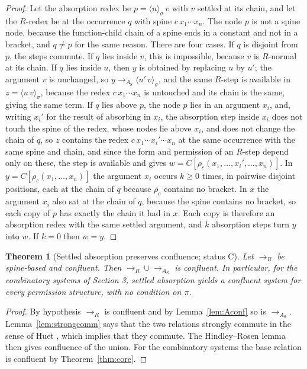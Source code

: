 \documentclass[11pt]{article}
\newtheorem{theorem}{Theorem}[section]
\theoremstyle{definition}
\theoremstyle{remark}
\newcommand{\br}[2]{\langle #1\rangle_{#2}}
\newcommand{\Ct}{status C}
\begin{document}
\begin{proof}
Let the absorption redex be $p=\br u\sigma\,v$ with $v$ settled at its chain, and let the $R$-redex be at the occurrence $q$ with spine $c\,x_1\cdots x_n$. The node $p$ is not a spine node, because the function-child chain of a spine ends in a constant and not in a bracket, and $q\ne p$ for the same reason. There are four cases. If $q$ is disjoint from $p$, the steps commute. If $q$ lies inside $v$, this is impossible, because $v$ is $R$-normal at its chain. If $q$ lies inside $u$, then $y$ is obtained by replacing $u$ by $u'$; the argument $v$ is unchanged, so $y\to_{A_{\mathrm S}}\br{u'\,v}\sigma$, and the same $R$-step is available in $z=\br{u\,v}\sigma$, because the redex $c\,x_1\cdots x_n$ is untouched and its chain is the same, giving the same term. If $q$ lies above $p$, the node $p$ lies in an argument $x_i$, and, writing $x_i'$ for the result of absorbing in $x_i$, the absorption step inside $x_i$ does not touch the spine of the redex, whose nodes lie above $x_i$, and does not change the chain of $q$, so $z$ contains the redex $c\,x_1\cdots x_i'\cdots x_n$ at the same occurrence with the same spine and chain, and since the form and permission of an $R$-step depend only on these, the step is available and gives $w=C[\rho_c(x_1,\dots,x_i',\dots,x_n)]$. In $y=C[\rho_c(x_1,\dots,x_n)]$ the argument $x_i$ occurs $k\ge0$ times, in pairwise disjoint positions, each at the chain of $q$ because $\rho_c$ contains no bracket. In $x$ the argument $x_i$ also sat at the chain of $q$, because the spine contains no bracket, so each copy of $p$ has exactly the chain it had in $x$. Each copy is therefore an absorption redex with the same settled argument, and $k$ absorption steps turn $y$ into $w$. If $k=0$ then $w=y$.
\end{proof}

\begin{theorem}[Settled absorption preserves confluence; \Ct]\label{thm:settled}
Let $\to_R$ be spine-based and confluent. Then $\to_R\cup\to_{A_{\mathrm S}}$ is confluent. In particular, for the combinatory systems of Section 3, settled absorption yields a confluent system for every permission structure, with no condition on $\pi$.
\end{theorem}

\begin{proof}
By hypothesis $\to_R$ is confluent and by Lemma~\ref{lem:Aconf} so is $\to_{A_{\mathrm S}}$. Lemma~\ref{lem:strongcomm} says that the two relations strongly commute in the sense of Huet \citep{huet1980}, which implies that they commute. The Hindley--Rosen lemma \citep[Ch.~1]{terese2003} then gives confluence of the union. For the combinatory systems the base relation is confluent by Theorem~\ref{thm:core}.
\end{proof}
\end{document}
